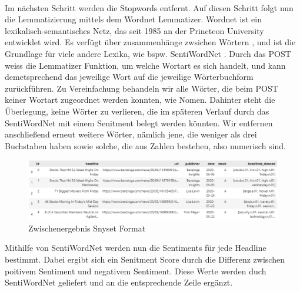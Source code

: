 \\
Im nächsten Schritt werden die Stopwords entfernt. Auf diesen Schritt folgt nun die Lemmatizierung mittels dem Wordnet Lemmatizer. Wordnet ist ein lexikalisch-semantisches Netz, das seit 1985 an der Princteon University entwicklet wird. Es verfügt über zusammenhänge zwsichen Wörtern  \citep{miller1995}, und ist die Grundlage für viele andere Lexika, wie bspw. SentiWordNet \citep{bacianella2010}. Durch das POST weiss die Lemmatizer Funktion, um welche Wortart es sich handelt, und kann demetsprechend das jeweilige Wort auf die jeweilige Wörterbuchform zurückführen. Zu Vereinfachung behandeln wir alle Wörter, die beim POST keiner Wortart zugeordnet werden konnten, wie Nomen. Dahinter steht die Überlegung, keine Wörter zu verlieren, die im späteren Verlauf durch das SentiWordNet mit einem Senitment belegt werden könnten. Wir entfernen anschließend erneut weitere Wörter, nämlich jene, die weniger als drei Buchstaben haben sowie solche, die aus Zahlen bestehen, also numerisch sind.\\
\begin{figure}[t]
    \includegraphics[scale=0.54]{img/Ausschnitt_Zwischenergebnis_2.png}
    \caption{Zwischenergebnis Snyset Format}
    \label{Zwischenergebnis_2}
\end{figure}
Mithilfe von SentiWordNet werden nun die Sentiments für jede Headline bestimmt. Dabei ergibt sich ein Senitment Score durch die Differenz zwischen poitivem Sentiment und negativem Sentiment. Diese Werte werden duch SentiWordNet geliefert und an die entsprechende Zeile ergänzt.

